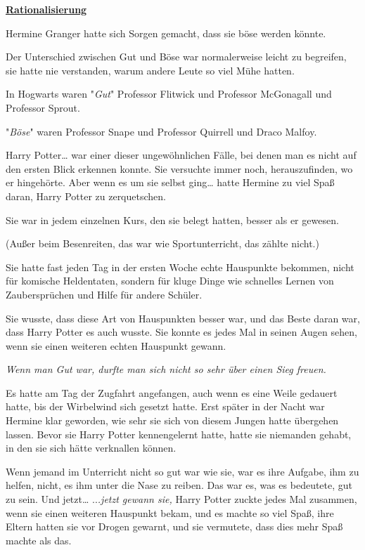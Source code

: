 

\hypertarget{rationalisierung}{%

\textbf{\uline{Rationalisierung}}

Hermine Granger hatte sich Sorgen gemacht, dass sie böse werden könnte.

Der Unterschied zwischen Gut und Böse war normalerweise leicht zu begreifen, sie hatte nie verstanden, warum andere Leute so viel Mühe hatten.

In Hogwarts waren "\emph{Gut}" Professor Flitwick und Professor McGonagall und Professor Sprout.

"\emph{Böse}" waren Professor Snape und Professor Quirrell und Draco Malfoy.

Harry Potter… war einer dieser ungewöhnlichen Fälle, bei denen man es nicht auf den ersten Blick erkennen konnte. Sie versuchte immer noch, herauszufinden, wo er hingehörte. Aber wenn es um sie selbst ging… hatte Hermine zu viel Spaß daran, Harry Potter zu zerquetschen.

Sie war in jedem einzelnen Kurs, den sie belegt hatten, besser als er gewesen.

(Außer beim Besenreiten, das war wie Sportunterricht, das zählte nicht.)

Sie hatte fast jeden Tag in der ersten Woche echte Hauspunkte bekommen, nicht für komische Heldentaten, sondern für kluge Dinge wie schnelles Lernen von Zaubersprüchen und Hilfe für andere Schüler.

Sie wusste, dass diese Art von Hauspunkten besser war, und das Beste daran war, dass Harry Potter es auch wusste. Sie konnte es jedes Mal in seinen Augen sehen, wenn sie einen weiteren echten Hauspunkt gewann.

\emph{Wenn man Gut war, durfte man sich nicht so sehr über einen Sieg freuen.}

Es hatte am Tag der Zugfahrt angefangen, auch wenn es eine Weile gedauert hatte, bis der Wirbelwind sich gesetzt hatte. Erst später in der Nacht war Hermine klar geworden, wie sehr sie sich von diesem Jungen hatte übergehen lassen. Bevor sie Harry Potter kennengelernt hatte, hatte sie niemanden gehabt, in den sie sich hätte verknallen können.

Wenn jemand im Unterricht nicht so gut war wie sie, war es ihre Aufgabe, ihm zu helfen, nicht, es ihm unter die Nase zu reiben. Das war es, was es bedeutete, gut zu sein. Und jetzt… ..\emph{.jetzt gewann sie,} Harry Potter zuckte jedes Mal zusammen, wenn sie einen weiteren Hauspunkt bekam, und es machte so viel Spaß, ihre Eltern hatten sie vor Drogen gewarnt, und sie vermutete, dass dies mehr Spaß machte als das.

}
